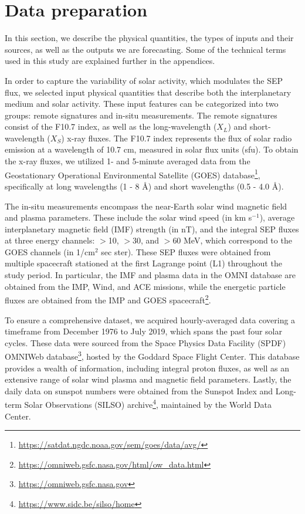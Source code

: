 \section{Data preparation}
\label{sec_ch4_data_prep}
In this section, we describe the physical quantities, the types of inputs and their sources, as well as the outputs we are forecasting.
Some of the technical terms used in this study are explained further in the appendices.

In order to capture the variability of solar activity, which modulates the SEP flux, we selected input physical quantities that describe both the interplanetary medium and solar activity. These input features can be categorized into two groups: remote signatures and in-situ measurements.
The remote signatures consist of the F10.7 index, as well as the long-wavelength ($X_L$) and short-wavelength ($X_S$) x-ray fluxes. The F10.7 index represents the flux of solar radio emission at a wavelength of 10.7 cm, measured in solar flux units (sfu). To obtain the x-ray fluxes, we utilized 1- and 5-minute averaged data from the Geostationary Operational Environmental Satellite (GOES) database\footnote{\url{https://satdat.ngdc.noaa.gov/sem/goes/data/avg/}}, specifically at long wavelengths (1 - 8 \AA) and short wavelengths (0.5 - 4.0 \AA).

The in-situ measurements encompass the near-Earth solar wind magnetic field and plasma parameters. These include the solar wind speed (in km s$^{-1}$), average interplanetary magnetic field (IMF) strength (in nT), and the integral SEP fluxes at three energy channels: $>$10, $>$30, and $>$60 MeV, which correspond to the GOES channels (in 1/cm$^2$ sec ster). These SEP fluxes were obtained from multiple spacecraft stationed at the first Lagrange point (L1) throughout the study period.
In particular, the IMF and plasma data in the OMNI database are obtained from the IMP, Wind, and ACE missions, while the energetic particle fluxes are obtained from the IMP and GOES spacecraft\footnote{\url{https://omniweb.gsfc.nasa.gov/html/ow_data.html}}.

To ensure a comprehensive dataset, we acquired hourly-averaged data covering a timeframe from December 1976 to July 2019, which spans the past four solar cycles. These data were sourced from the Space Physics Data Facility (SPDF) OMNIWeb database\footnote{\url{https://omniweb.gsfc.nasa.gov}}, hosted by the Goddard Space Flight Center. This database provides a wealth of information, including integral proton fluxes, as well as an extensive range of solar wind plasma and magnetic field parameters.
Lastly, the daily data on sunspot numbers were obtained from the Sunspot Index and Long-term Solar Observations (SILSO) archive\footnote{\url{https://www.sidc.be/silso/home}}, maintained by the World Data Center.


